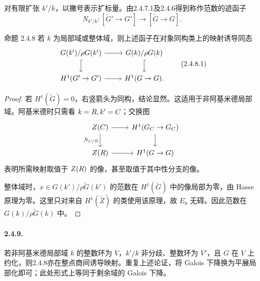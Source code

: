 对有限扩张 $k'/k$，以撇号表示扩标量。由2.4.7.1及2.4.6得到称作范数的迹函子
\begin{equation}
 N_{k'/k}:[\widetilde G'\to G']\longrightarrow[\widetilde G\to G].
 \tag{2.4.7.4}
\end{equation}
\begin{originaltheorem}{命题 2.4.8}
若 $k$ 为局部域或整体域，则上述函子在对象同构类上的映射诱导同态
\begin{equation}
 \begin{tikzcd}
 G(k')/\rho\widetilde G(k')\arrow[r]\arrow[d,hook]&G(k)/\rho\widetilde G(k)\arrow[d,hook]\\
 H^1(\widetilde G'\to G')\arrow[r]&H^1(\widetilde G\to G).
 \end{tikzcd}
 \tag{2.4.8.1}
\end{equation}
\end{originaltheorem}
\begin{proof}
若 $H^1(\widetilde G)=0$，右竖箭头为同构，结论显然。这适用于非阿基米德局部域。阿基米德时只需看 $k=R,k'=C$；交换图
\[
 \begin{tikzcd}
 Z(\C)\arrow[r]\arrow[d,"N_{\C/\R}"']&H^1(\widetilde G_{\C}\to G_{\C})\arrow[d]\\
 Z(\R)\arrow[r]&H^1(\widetilde G\to G)
 \end{tikzcd}
\]
表明所需映射取值于 $Z(R)$ 的像，甚至取值于其中性分支的像。

整体域时，$x\in G(k')/\rho\widetilde G(k')$ 的范数在 $H^1(\widetilde G)$ 中的像局部为零，由 Hasse 原理为零。这里只对来自 $H^1(\widetilde Z)$ 的类使用该原理，故 $E_8$ 无碍。因此范数在 $G(k)/\rho\widetilde G(k)$ 中。
\end{proof}
\paragraph*{2.4.9.} 若非阿基米德局部域 $k$ 的整数环为 $V$，$k'/k$ 非分歧、整数环为 $V'$，且 $G$ 在 $V$ 上约化，则2.4.8亦在整点商间诱导映射。重复上述论证，将 Galois 下降换为平展局部化即可；此处形式上等同于剩余域的 Galois 下降。

